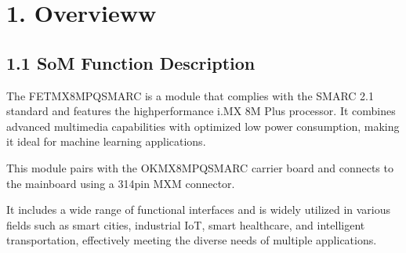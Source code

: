 \documentclass[letterpaper,10pt,openany,english]{sphinxmanual}
\begin{document}
\pagestyle{plain}
\sphinxtableofcontents
\pagestyle{normal}
\label{\detokenize{hardware::doc}}



\chapter{1. Overvieww}
\label{\detokenize{hardware:overvieww}}

\section{1.1 SoM Function Description}
\label{\detokenize{hardware:som-function-description}}
\sphinxAtStartPar
The FET\sphinxhyphen{}MX8MPQ\sphinxhyphen{}SMARC is a module that complies with the SMARC 2.1 standard and features the high\sphinxhyphen{}performance i.MX 8M Plus processor. It combines advanced multimedia capabilities with optimized low power consumption, making it ideal for machine learning applications.

\sphinxAtStartPar
This module pairs with the OK\sphinxhyphen{}MX8MPQ\sphinxhyphen{}SMARC carrier board and connects to the mainboard using a 314\sphinxhyphen{}pin MXM connector.

\sphinxAtStartPar
It includes a wide range of functional interfaces and is widely utilized in various fields such as smart cities, industrial IoT, smart healthcare, and intelligent transportation, effectively meeting the diverse needs of multiple applications.
\end{document}
